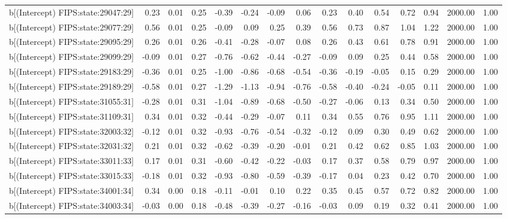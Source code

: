 \begin{table}[ht]
\begin{tabular}{rrrrrrrrrrrrrrr}
  b[(Intercept) FIPS:state:29047:29] & 0.23 & 0.01 & 0.25 & -0.39 & -0.24 & -0.09 & 0.06 & 0.23 & 0.40 & 0.54 & 0.72 & 0.94 & 2000.00 & 1.00 \\ 
  b[(Intercept) FIPS:state:29077:29] & 0.56 & 0.01 & 0.25 & -0.09 & 0.09 & 0.25 & 0.39 & 0.56 & 0.73 & 0.87 & 1.04 & 1.22 & 2000.00 & 1.00 \\ 
  b[(Intercept) FIPS:state:29095:29] & 0.26 & 0.01 & 0.26 & -0.41 & -0.28 & -0.07 & 0.08 & 0.26 & 0.43 & 0.61 & 0.78 & 0.91 & 2000.00 & 1.00 \\ 
  b[(Intercept) FIPS:state:29099:29] & -0.09 & 0.01 & 0.27 & -0.76 & -0.62 & -0.44 & -0.27 & -0.09 & 0.09 & 0.25 & 0.44 & 0.58 & 2000.00 & 1.00 \\ 
  b[(Intercept) FIPS:state:29183:29] & -0.36 & 0.01 & 0.25 & -1.00 & -0.86 & -0.68 & -0.54 & -0.36 & -0.19 & -0.05 & 0.15 & 0.29 & 2000.00 & 1.00 \\ 
  b[(Intercept) FIPS:state:29189:29] & -0.58 & 0.01 & 0.27 & -1.29 & -1.13 & -0.94 & -0.76 & -0.58 & -0.40 & -0.24 & -0.05 & 0.11 & 2000.00 & 1.00 \\ 
  b[(Intercept) FIPS:state:31055:31] & -0.28 & 0.01 & 0.31 & -1.04 & -0.89 & -0.68 & -0.50 & -0.27 & -0.06 & 0.13 & 0.34 & 0.50 & 2000.00 & 1.00 \\ 
  b[(Intercept) FIPS:state:31109:31] & 0.34 & 0.01 & 0.32 & -0.44 & -0.29 & -0.07 & 0.11 & 0.34 & 0.55 & 0.76 & 0.95 & 1.11 & 2000.00 & 1.00 \\ 
  b[(Intercept) FIPS:state:32003:32] & -0.12 & 0.01 & 0.32 & -0.93 & -0.76 & -0.54 & -0.32 & -0.12 & 0.09 & 0.30 & 0.49 & 0.62 & 2000.00 & 1.00 \\ 
  b[(Intercept) FIPS:state:32031:32] & 0.21 & 0.01 & 0.32 & -0.62 & -0.39 & -0.20 & -0.01 & 0.21 & 0.42 & 0.62 & 0.85 & 1.03 & 2000.00 & 1.00 \\ 
  b[(Intercept) FIPS:state:33011:33] & 0.17 & 0.01 & 0.31 & -0.60 & -0.42 & -0.22 & -0.03 & 0.17 & 0.37 & 0.58 & 0.79 & 0.97 & 2000.00 & 1.00 \\ 
  b[(Intercept) FIPS:state:33015:33] & -0.18 & 0.01 & 0.32 & -0.93 & -0.80 & -0.59 & -0.39 & -0.17 & 0.04 & 0.23 & 0.42 & 0.70 & 2000.00 & 1.00 \\ 
  b[(Intercept) FIPS:state:34001:34] & 0.34 & 0.00 & 0.18 & -0.11 & -0.01 & 0.10 & 0.22 & 0.35 & 0.45 & 0.57 & 0.72 & 0.82 & 2000.00 & 1.00 \\ 
  b[(Intercept) FIPS:state:34003:34] & -0.03 & 0.00 & 0.18 & -0.48 & -0.39 & -0.27 & -0.16 & -0.03 & 0.09 & 0.19 & 0.32 & 0.41 & 2000.00 & 1.00 \\ 

\end{tabular}
\end{table}
